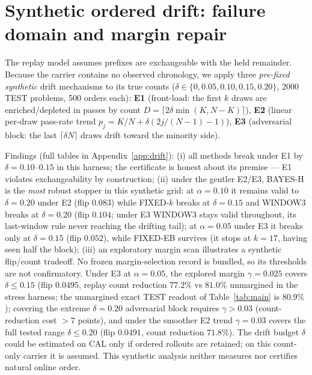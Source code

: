 \documentclass{article}
\theoremstyle{definition}
\theoremstyle{remark}
\begin{document}
\section{Synthetic ordered drift: failure domain and margin repair}
\label{sec:drift}

The replay model assumes prefixes are exchangeable with the held remainder.
Because the carrier contains no observed chronology, we apply three
\emph{pre-fixed synthetic} drift mechanisms to its true counts
($\delta\in\{0,0.05,0.10,0.15,0.20\}$, 2000 TEST problems, 500 orders each):
\textbf{E1} (front-load: the first $k$ draws are enriched/depleted in passes
by count $D=\lceil 2\delta\min(K,N{-}K)\rceil$), \textbf{E2} (linear per-draw
pass-rate trend $p_j=K/N+\delta(2j/(N{-}1){-}1)$), \textbf{E3} (adversarial
block: the last $\lceil\delta N\rceil$ draws drift toward the minority side).

Findings (full tables in Appendix~\ref{app:drift}):
(i) all methods break under E1 by $\delta=0.10$--$0.15$ in this harness; the certificate is
honest about its premise --- E1 violates exchangeability by construction;
(ii) under the gentler E2/E3, BAYES-H is the \emph{most} robust stopper in this synthetic grid: at
$\alpha=0.10$ it remains valid to $\delta=0.20$ under E2 (flip $0.083$) while
FIXED-$k$ breaks at $\delta=0.15$ and WINDOW3 breaks at $\delta=0.20$
(flip $0.104$; under E3 WINDOW3 stays valid throughout, its last-window
rule never reaching the drifting tail); at $\alpha=0.05$ under E3 it
breaks only at $\delta=0.15$ (flip $0.052$), while FIXED-EB survives (it stops
at $k=17$, having seen half the block); (iii) an exploratory margin scan
illustrates a synthetic flip/count tradeoff. No frozen margin-selection record
is bundled, so its thresholds are not confirmatory. Under E3 at $\alpha=0.05$,
the explored margin $\gamma=0.025$
covers $\delta\le0.15$ (flip $0.0495$, replay count reduction $77.2\%$ vs $81.0\%$
unmargined in the stress harness; the unmargined exact TEST readout of
Table~\ref{tab:main} is $80.9\%$); covering the extreme $\delta=0.20$
adversarial block requires
$\gamma>0.03$ (count-reduction cost $>7$ points), and under the smoother E2 trend
$\gamma=0.03$ covers the full tested range $\delta\le0.20$ (flip $0.0491$,
count reduction $71.8\%$). The drift budget $\delta$ could be estimated on CAL
only if ordered rollouts are retained; on this count-only carrier it is assumed.
This synthetic analysis neither measures nor certifies natural online order.
\end{document}
